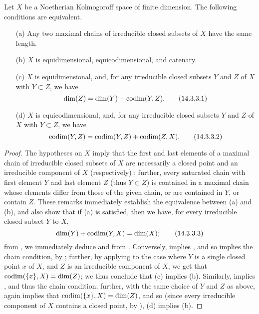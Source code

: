 \begin{proposition}[14.3.3]
\label{0.14.3.3}
Let $X$ be a Noetherian Kolmogoroff space of finite dimension.
The following conditions are equivalent.
\begin{enumerate}
  \item[{\rm(a)}] Any two maximal chains of irreducible closed subsets of $X$ have the same length.
  \item[{\rm(b)}] $X$ is equidimensional, equicodimensional, and catenary.
  \item[{\rm(c)}] $X$ is equidimensional, and, for any irreducible closed subsets $Y$ and $Z$ of $X$ with $Y\subset Z$, we have
    \[
    \label{0.14.3.3.1}
      \dim(Z)=\dim(Y)+\operatorname{codim}(Y,Z).
      \tag{14.3.3.1}
    \]
  \item[{\rm(d)}] $X$ is equicodimensional, and, for any irreducible closed subsets $Y$ and $Z$ of $X$ with $Y\subset Z$, we have
    \[
    \label{0.14.3.3.2}
      \operatorname{codim}(Y,Z)=\operatorname{codim}(Y,Z)+\operatorname{codim}(Z,X).
      \tag{14.3.3.2}
    \]
\end{enumerate}
\end{proposition}

\begin{proof}
The hypotheses on $X$ imply that the first and last elements of a maximal chain of irreducible closed subsets of $X$ are necessarily a closed point and an irreducible component of $X$ (respectively) ;
further, every saturated chain with first element $Y$ and last element $Z$ (thus $Y\subset Z$) is contained in a maximal chain whose elements differ from those of the given chain, or are contained in $Y$, or contain $Z$.
These remarks immediately establish the equivalence between (a) and (b), and also show that if (a) is satisfied, then we have, for every irreducible closed subset $Y$ to $X$,
\[
\label{0.14.3.3.3}
  \dim(Y)+\operatorname{codim}(Y,X)=\dim(X);
  \tag{14.3.3.3}
\]
from , we immediately deduce  and  from .
Conversely,  implies , and so  implies the chain condition, by ;
further, by applying  to the case where $Y$ is a single closed point $x$ of $X$, and $Z$ is an irreducible component of $X$, we get that $\operatorname{codim}(\{x\},X)=\dim(Z)$;
we thus conclude that (c) implies (b).
Similarly,  implies , and thus the chain condition;
further, with the same choice of $Y$ and $Z$ as above,  again implies that $\operatorname{codim}(\{x\},X)=\dim(Z)$, and so (since every irreducible component of $X$ contains a closed point, by ), (d) implies (b).
\end{proof}

